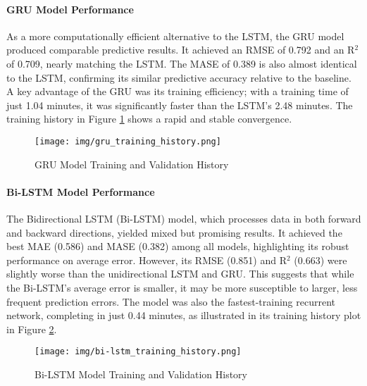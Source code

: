 \paragraph{GRU Model Performance}
As a more computationally efficient alternative to the LSTM, the GRU model produced comparable predictive results. It achieved an RMSE of 0.792 and an R$^2$ of 0.709, nearly matching the LSTM. The MASE of 0.389 is also almost identical to the LSTM, confirming its similar predictive accuracy relative to the baseline. A key advantage of the GRU was its training efficiency; with a training time of just 1.04 minutes, it was significantly faster than the LSTM's 2.48 minutes. The training history in Figure \ref{fig:gru_training_history} shows a rapid and stable convergence.
\begin{figure}[h!]
\centering
\texttt{[image: img/gru\_training\_history.png]}
\caption{GRU Model Training and Validation History}
\label{fig:gru_training_history}
\end{figure}

\paragraph{Bi-LSTM Model Performance}
The Bidirectional LSTM (Bi-LSTM) model, which processes data in both forward and backward directions, yielded mixed but promising results. It achieved the best MAE (0.586) and MASE (0.382) among all models, highlighting its robust performance on average error. However, its RMSE (0.851) and R$^2$ (0.663) were slightly worse than the unidirectional LSTM and GRU. This suggests that while the Bi-LSTM's average error is smaller, it may be more susceptible to larger, less frequent prediction errors. The model was also the fastest-training recurrent network, completing in just 0.44 minutes, as illustrated in its training history plot in Figure \ref{fig:bi-lstm_training_history}.
\begin{figure}[h!]
\centering
\texttt{[image: img/bi-lstm\_training\_history.png]}
\caption{Bi-LSTM Model Training and Validation History}
\label{fig:bi-lstm_training_history}
\end{figure}

